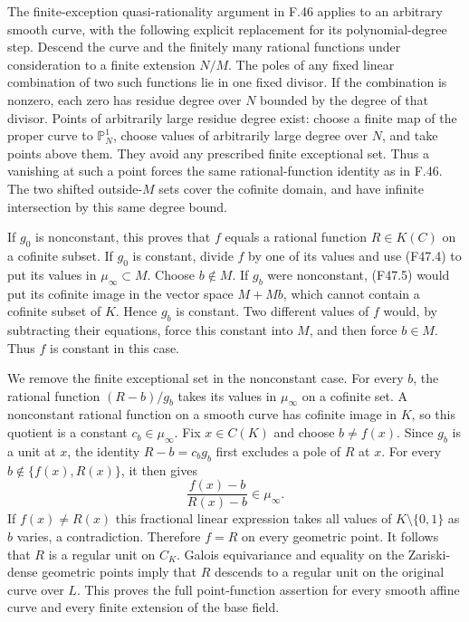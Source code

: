 The finite-exception quasi-rationality argument in F.46 applies to
an arbitrary smooth curve, with the following explicit replacement
for its polynomial-degree step. Descend the curve and the finitely
many rational functions under consideration to a finite extension
$N/M$. The poles of any fixed linear combination of two such
functions lie in one fixed divisor. If the combination is nonzero,
each zero has residue degree over $N$ bounded by the degree of that
divisor. Points of arbitrarily large residue degree exist: choose a
finite map of the proper curve to $\mathbb P^1_N$, choose values of
arbitrarily large degree over $N$, and take points above them.
They avoid any prescribed finite exceptional set. Thus a vanishing
at such a point forces the same rational-function identity as in
F.46. The two shifted outside-$M$ sets cover the cofinite domain,
and have infinite intersection by this same degree bound.

If $g_0$ is nonconstant, this proves that $f$ equals a rational
function $R\in K(C)$ on a cofinite subset. If $g_0$ is constant,
divide $f$ by one of its values and use (F47.4) to put its values
in $\mu_\infty\subset M$. Choose $b\notin M$. If $g_b$ were
nonconstant, (F47.5) would put its cofinite image in the vector
space $M+Mb$, which cannot contain a cofinite subset of $K$.
Hence $g_b$ is constant. Two different values of $f$ would, by
subtracting their equations, force this constant into $M$, and
then force $b\in M$. Thus $f$ is constant in this case.

We remove the finite exceptional set in the nonconstant case.
For every $b$, the rational function $(R-b)/g_b$ takes its values
in $\mu_\infty$ on a cofinite set. A nonconstant rational function
on a smooth curve has cofinite image in $K$, so this quotient is a
constant $c_b\in\mu_\infty$. Fix $x\in C(K)$ and choose
$b\ne f(x)$. Since $g_b$ is a unit at $x$, the identity
$R-b=c_b g_b$ first excludes a pole of $R$ at $x$. For every
$b\notin\{f(x),R(x)\}$, it then gives
\[
 \frac{f(x)-b}{R(x)-b}\in\mu_\infty.
\]
If $f(x)\ne R(x)$ this fractional linear expression takes all
values of $K\setminus\{0,1\}$ as $b$ varies, a contradiction.
Therefore $f=R$ on every geometric point. It follows that $R$ is
a regular unit on $C_K$. Galois equivariance and equality on the
Zariski-dense geometric points imply that $R$ descends to a regular
unit on the original curve over $L$. This proves the full
point-function assertion for every smooth affine curve and every
finite extension of the base field.

